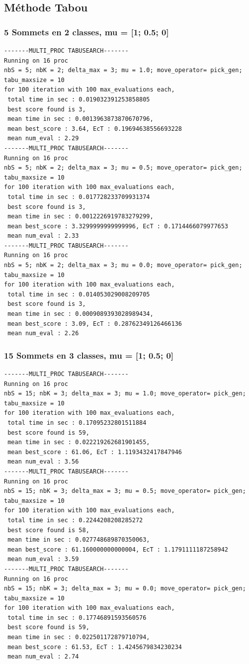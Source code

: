 \documentclass[a4paper]{article}
\begin{document}
\subsection{Méthode Tabou}
\subsubsection{5 Sommets en 2 classes, mu = [1; 0.5; 0]}
\begin{verbatim}
-------MULTI_PROC TABUSEARCH-------
Running on 16 proc
nbS = 5; nbK = 2; delta_max = 3; mu = 1.0; move_operator= pick_gen;
tabu_maxsize = 10
for 100 iteration with 100 max_evaluations each, 
 total time in sec : 0.019032391253858805
 best score found is 3,
 mean time in sec : 0.0013963873870670796,
 mean best_score : 3.64, EcT : 0.19694638556693228
 mean num_eval : 2.29
-------MULTI_PROC TABUSEARCH-------
Running on 16 proc
nbS = 5; nbK = 2; delta_max = 3; mu = 0.5; move_operator= pick_gen;
tabu_maxsize = 10
for 100 iteration with 100 max_evaluations each, 
 total time in sec : 0.017728233709931374
 best score found is 3,
 mean time in sec : 0.0012226919783279299,
 mean best_score : 3.3299999999999996, EcT : 0.1714466079977653
 mean num_eval : 2.33
-------MULTI_PROC TABUSEARCH-------
Running on 16 proc
nbS = 5; nbK = 2; delta_max = 3; mu = 0.0; move_operator= pick_gen;
tabu_maxsize = 10
for 100 iteration with 100 max_evaluations each, 
 total time in sec : 0.014053029008209705
 best score found is 3,
 mean time in sec : 0.0009089393028989434,
 mean best_score : 3.09, EcT : 0.28762349126466136
 mean num_eval : 2.26
\end{verbatim}
\subsubsection{15 Sommets en 3 classes, mu = [1; 0.5; 0]}
\begin{verbatim}
-------MULTI_PROC TABUSEARCH-------
Running on 16 proc
nbS = 15; nbK = 3; delta_max = 3; mu = 1.0; move_operator= pick_gen;
tabu_maxsize = 10
for 100 iteration with 100 max_evaluations each, 
 total time in sec : 0.17095232801511884
 best score found is 59,
 mean time in sec : 0.022219262681901455,
 mean best_score : 61.06, EcT : 1.1193432417847946
 mean num_eval : 3.56
-------MULTI_PROC TABUSEARCH-------
Running on 16 proc
nbS = 15; nbK = 3; delta_max = 3; mu = 0.5; move_operator= pick_gen;
tabu_maxsize = 10
for 100 iteration with 100 max_evaluations each, 
 total time in sec : 0.2244208208285272
 best score found is 58,
 mean time in sec : 0.027748689870350063,
 mean best_score : 61.160000000000004, EcT : 1.1791111187258942
 mean num_eval : 3.59
-------MULTI_PROC TABUSEARCH-------
Running on 16 proc
nbS = 15; nbK = 3; delta_max = 3; mu = 0.0; move_operator= pick_gen;
tabu_maxsize = 10
for 100 iteration with 100 max_evaluations each, 
 total time in sec : 0.17746891593560576
 best score found is 59,
 mean time in sec : 0.022501172879710794,
 mean best_score : 61.53, EcT : 1.4245679834230234
 mean num_eval : 2.74
\end{verbatim}
\end{document}
